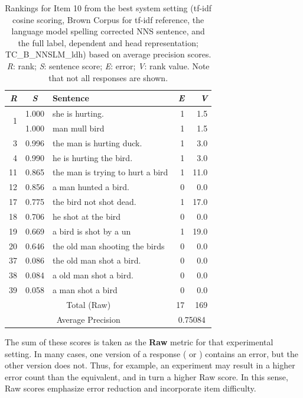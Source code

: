 \begin{table}[htb!]
\begin{center}
\setlength{\tabcolsep}{0.3em}
\begin{tabular}{|r|c|l|r|r|}
\hline
\textit{R} & \textit{S} & Sentence & \textit{E} & \textit{V}\\
\hline
\hline
\multirow{2}{*}{1} & 1.000 & she is hurting. & 1 & 1.5 \\
& 1.000 & man mull bird & 1 & 1.5 \\
\hline
3 & 0.996 & the man is hurting duck. & 1 & 3.0 \\
4 & 0.990 & he is hurting the bird. & 1 & 3.0 \\
\hline
11 & 0.865 & the man is trying to hurt a bird & 1 & 11.0 \\
12 & 0.856 & a man hunted a bird. & 0 & 0.0 \\
\hline
17 & 0.775 & the bird not shot dead.  & 1 & 17.0 \\
18 & 0.706 & he shot at the bird & 0 & 0.0 \\
19 & 0.669 & a bird is shot by a un & 1 & 19.0 \\
20 & 0.646 & the old man shooting the birds & 0 & 0.0 \\
\hline
37 & 0.086 & the old man shot a bird. & 0 & 0.0 \\
38 & 0.084 & a old man shot a bird. & 0 & 0.0 \\
39 & 0.058 & a man shot a bird & 0 & 0.0 \\
\hline
\hline
\multicolumn{3}{|c|}{Total (Raw)} & 17 & 169 \\
\hline
\multicolumn{3}{|c|}{Average Precision} & \multicolumn{2}{c|}{0.75084} \\
\hline
\end{tabular}
\caption{Rankings for Item 10 from the best system setting (tf-idf cosine scoring, Brown Corpus for tf-idf reference, the language model spelling corrected NNS sentence, and the full label, dependent and head representation; TC\_B\_NNSLM\_ldh) based on average precision scores. \textit{R}: rank; \textit{S}: sentence score; \textit{E}: error; \textit{V}: rank value. Note that not all responses are shown. }
\label{tab:i10responses-avgprec}
\end{center}
\end{table}

The sum of these scores is taken as the \textbf{Raw} metric for that
experimental setting. In many cases, one version of a response
( or ) contains an error, but the other
version does not. Thus, for example, an  experiment may
result in a higher error count than the  equivalent, and
in turn a higher Raw score.
In this sense, Raw scores emphasize error reduction and incorporate
item difficulty.

